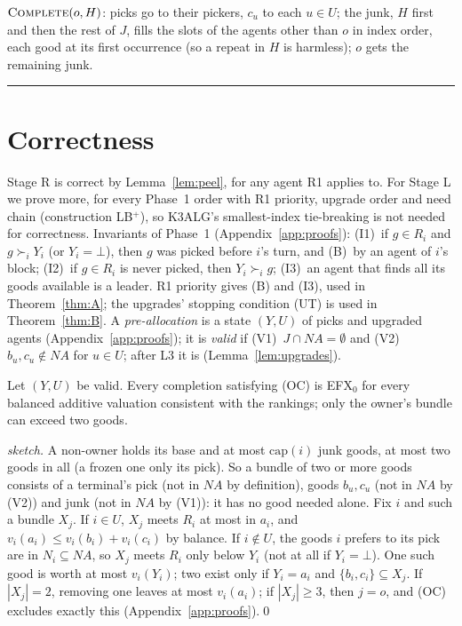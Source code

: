 \documentclass[runningheads,11pt]{llncs}
\newcommand{\efxz}{\texorpdfstring{\mbox{EFX$_0$}}{EFX0}}
\newcommand{\LBp}{\texorpdfstring{\mbox{LB$^{+}$}}{LB+}}
\newcommand{\NA}{\mathit{NA}}
\newcommand{\capa}{\mathrm{cap}}
\newcommand{\none}{\bot}
\begin{document}
$\textsc{Complete}(o,H)$: picks go to their pickers, $c_u$ to each $u\in U$; the junk, $H$ first and then the rest of $J$, fills the slots of the agents other than $o$ in index order, each good at its first occurrence (so a repeat in $H$ is harmless); $o$ gets the remaining junk.\par
\noindent\rule{\textwidth}{0.5pt}\par

\section{Correctness}\label{sec:correct}

Stage R is correct by Lemma~\ref{lem:peel}, for any agent R1 applies to. For Stage L we prove more, for every Phase~1 order with R1 priority, upgrade order and need chain (construction \LBp{}), so K3ALG's smallest-index tie-breaking is not needed for correctness. Invariants of Phase~1 (Appendix~\ref{app:proofs}): (I1)~if $g\in R_i$ and $g\succ_i Y_i$ (or $Y_i=\none$), then $g$ was picked before $i$'s turn, and (B)~by an agent of $i$'s block; (I2)~if $g\in R_i$ is never picked, then $Y_i\succ_i g$; (I3)~an agent that finds all its goods available is a leader. R1 priority gives (B) and (I3), used in Theorem~\ref{thm:A}; the upgrades' stopping condition (UT) is used in Theorem~\ref{thm:B}. A \emph{pre-allocation} is a state $(Y,U)$ of picks and upgraded agents (Appendix~\ref{app:proofs}); it is \emph{valid} if (V1)~$J\cap\NA=\emptyset$ and (V2)~$b_u,c_u\notin\NA$ for $u\in U$; after L3 it is (Lemma~\ref{lem:upgrades}).

\begin{theorem}[soundness]\label{thm:sound}
Let $(Y,U)$ be valid. Every completion satisfying (OC) is \efxz{} for every balanced additive valuation consistent with the rankings; only the owner's bundle can exceed two goods.
\end{theorem}

\begin{proof}[sketch]
A non-owner holds its base and at most $\capa(i)$ junk goods, at most two goods in all (a frozen one only its pick). So a bundle of two or more goods consists of a terminal's pick (not in $\NA$ by definition), goods $b_u,c_u$ (not in $\NA$ by (V2)) and junk (not in $\NA$ by (V1)): it has no good needed alone. Fix $i$ and such a bundle $X_j$. If $i\in U$, $X_j$ meets $R_i$ at most in $a_i$, and $v_i(a_i)\le v_i(b_i)+v_i(c_i)$ by balance. If $i\notin U$, the goods $i$ prefers to its pick are in $N_i\subseteq\NA$, so $X_j$ meets $R_i$ only below $Y_i$ (not at all if $Y_i=\none$). One such good is worth at most $v_i(Y_i)$; two exist only if $Y_i=a_i$ and $\{b_i,c_i\}\subseteq X_j$. If $|X_j|=2$, removing one leaves at most $v_i(a_i)$; if $|X_j|\ge3$, then $j=o$, and (OC) excludes exactly this (Appendix~\ref{app:proofs}).\qed
\end{proof}
\end{document}
